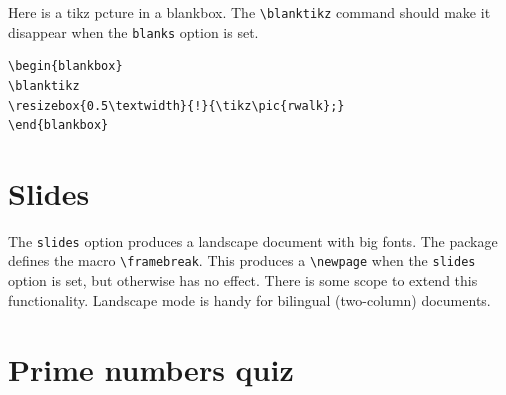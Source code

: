 \documentclass{article}
\theoremstyle{break}
\begin{document}
Here is a tikz pcture in a blankbox. The \verb+\blanktikz+ command should make it disappear when the {\tt blanks} option is set.
\begin{Verbatim}[frame=single]
\begin{blankbox}
\blanktikz
\resizebox{0.5\textwidth}{!}{\tikz\pic{rwalk};}
\end{blankbox}
\end{Verbatim}

\begin{blankbox}
\blanktikz
{}
\end{blankbox}
%

\section{Slides}

The \verb+slides+ option produces a landscape document with big fonts. The package defines the macro \verb+\framebreak+. This produces a \verb+\newpage+ when the \verb+slides+ option is set, but otherwise has no effect. There is some scope to extend this functionality. Landscape mode is handy for bilingual (two-column) documents.


\appendix

\newpage
\section{Prime numbers quiz}
\end{document}
